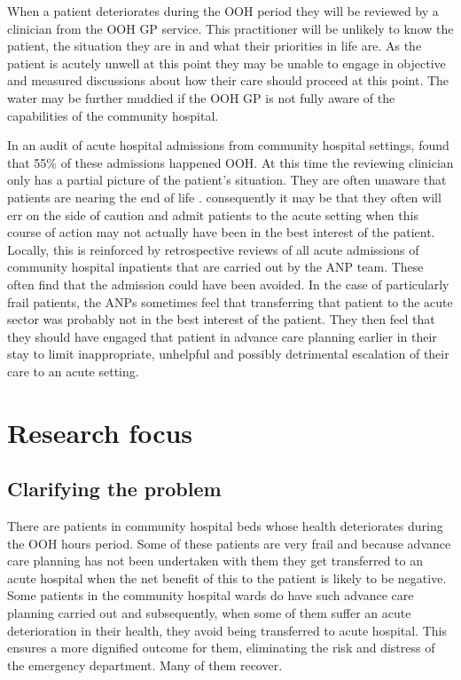 \documentclass
[
	12pt,
	a4paper,
	oneside,
]{report}
\begin{document}
When a patient deteriorates during the OOH period they will be reviewed by a clinician
from the OOH GP service. This practitioner will be unlikely to know the patient,
the situation they are in and what their priorities in life are. As the patient is
acutely unwell at this point they may be unable to engage in objective and measured
discussions about how their care should proceed at this point. The water may be
further muddied if the OOH GP is not fully aware of the capabilities of the 
community hospital. 

In an audit of acute hospital admissions from community hospital settings,
\textcite{endacott:15} found that 55\% of these admissions happened OOH. 
At this time the reviewing clinician only has a partial picture of the 
patient's situation. They are often unaware that patients are nearing the end
of life \parencite{brettell:18}. consequently it may 
be that they often will err on the side of caution and
admit patients to the acute setting when this course of action may not actually have
been in the best interest of the patient. Locally, this is reinforced by 
retrospective reviews
of all acute admissions of community hospital inpatients that are carried out by the 
ANP team. These often find that the admission could have been avoided. In the case
of particularly frail patients, the ANPs sometimes feel that transferring that
patient to the acute sector was probably not in the best interest of the patient. 
They then feel that they should have engaged that patient in advance care planning
earlier in their stay to limit inappropriate, unhelpful and possibly detrimental 
escalation of their care to an acute setting.

\section{Research focus}

\subsection{Clarifying the problem}

There are patients in community hospital beds whose health deteriorates during
the OOH hours period. Some of these patients are very frail and because advance
care planning has not been undertaken with them they get transferred to an acute 
hospital when the net benefit of this to the patient is likely to be negative.
Some patients in the community hospital wards do have such advance care planning 
carried out and subsequently, when some of them suffer an acute deterioration in
their health, they avoid being transferred to acute hospital. This ensures a more
dignified outcome for them, eliminating the risk and distress of the emergency
department. Many of them recover.
\end{document}
